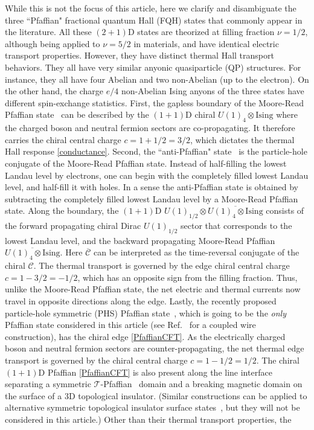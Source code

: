 While this is not the focus of this article, here we clarify and disambiguate the three ``Pfaffian" fractional quantum Hall (\hypertarget{FQH}{FQH}) states that commonly appear in the literature. All these $(2+1)$D states are theorized at filling fraction $\nu=1/2$, although being applied to $\nu=5/2$ in materials, and have identical electric transport properties. However, they have distinct thermal Hall transport behaviors. They all have very similar anyonic quasiparticle (\hypertarget{QP}{QP}) structures. For instance, they all have four Abelian and two non-Abelian \QP (up to the electron). On the other hand, the charge $e/4$ non-Abelian Ising anyons of the three states have different spin-exchange statistics. First, the gapless boundary of the Moore-Read Pfaffian \FQH state~\cite{MooreRead,ReadMoore,GreiterWenWilczekPRL91,GreiterWenWilczek91} can be described by the $(1+1)$D chiral \CFT $U(1)_4\otimes\mathrm{Ising}$ where the charged boson and neutral fermion sectors are co-propagating. It therefore carries the chiral central charge $c=1+1/2=3/2$, which dictates the thermal Hall response \eqref{conductance}. Second, the ``anti-Pfaffian" \FQH state~\cite{LevinHalperinRosenow07,LeeRyuNayakFisher07} is the particle-hole conjugate of the Moore-Read Pfaffian state. Instead of half-filling the lowest Landau level by electrons, one can begin with the completely filled lowest Landau level, and half-fill it with holes. In a sense the anti-Pfaffian state is obtained by subtracting the completely filled lowest Landau level by a Moore-Read Pfaffian state. Along the boundary, the $(1+1)$D \CFT $U(1)_{1/2}\otimes\overline{U(1)_4\otimes\mathrm{Ising}}$ consists of the forward propagating chiral Dirac $U(1)_{1/2}$ sector that corresponds to the lowest Landau level, and the backward propagating Moore-Read Pfaffian $\overline{U(1)_4\otimes\mathrm{Ising}}$. Here $\overline{\mathcal{C}}$ can be interpreted as the time-reversal conjugate of the chiral \CFT $\mathcal{C}$. The thermal transport is governed by the edge chiral central charge $c=1-3/2=-1/2$, which has an opposite sign from the filling fraction. Thus, unlike the Moore-Read Pfaffian state, the net electric and thermal currents now travel in opposite directions along the edge. Lastly, the recently proposed particle-hole symmetric (\hypertarget{PHS}{PHS}) Pfaffian state~\cite{Son15,BarkeshliMulliganFisher15,WangSenthil16}, which is going to be the {\em only} Pfaffian \FQH state considered in this article (see Ref.~\cite{KaneSternHalperin17} for a coupled wire construction), has the chiral edge \CFT \eqref{PfaffianCFT}. As the electrically charged boson and neutral fermion sectors are counter-propagating, the net thermal edge transport is governed by the chiral central charge $c=1-1/2=1/2$. The chiral $(1+1)$D \PHS Pfaffian \CFT \eqref{PfaffianCFT} is also present along the line interface separating a \TR symmetric $\mathcal{T}$-Pfaffian~\cite{ChenFidkowskiVishwanath14} domain and a \TR breaking magnetic domain on the surface of a 3D topological insulator. (Similar constructions can be applied to alternative \TR symmetric topological insulator surface states~\cite{WangPotterSenthilgapTI13,MetlitskiKaneFisher13b,BondersonNayakQi13}, but they will not be considered in this article.) Other than their thermal transport properties, the 
